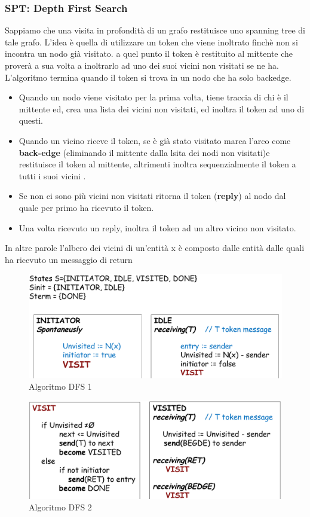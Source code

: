 \documentclass[12pt]{article}
\begin{document}
		\subsubsection{SPT: Depth First Search}
			Sappiamo che una visita in profondità di un grafo restituisce uno spanning tree di tale grafo.
			L'idea è quella di utilizzare un token che viene inoltrato finchè non si incontra un nodo già visitato. a quel punto il token è restituito al mittente che proverà a sua volta a inoltrarlo ad uno dei suoi vicini non visitati se ne ha. L'algoritmo termina quando il token si trova in un nodo che ha solo backedge.
			\begin{itemize}
				\item Quando un nodo viene visitato per la prima volta, tiene traccia di chi è il mittente ed, crea una lista dei vicini non visitati, ed inoltra il token ad uno di questi.
				\item Quando un vicino riceve il token, se è già stato visitato marca l'arco come \textbf{back-edge} (eliminando il mittente dalla lsita dei nodi non visitati)e restituisce il token al mittente, altrimenti inoltra sequenzialmente il token a tutti i suoi vicini .
				\item Se non ci sono più vicini non visitati ritorna il token (\textbf{reply}) al nodo dal quale per primo ha ricevuto il token.
				\item Una volta ricevuto un reply, inoltra il token ad un altro vicino non visitato. 
			\end{itemize}
			In altre parole l'albero dei vicini di un'entità x è composto dalle entità dalle quali ha ricevuto un messaggio di return 
			\begin{figure}[h!]
				\centering
				\includegraphics[scale=0.3]{img/dfs.png}
				\caption{Algoritmo DFS 1}
			\end{figure}
			\begin{figure}[h!]
				\centering
				\includegraphics[scale=0.3]{img/dfs2.png}
				\caption{Algoritmo DFS 2}
			\end{figure}
		
\end{document}
